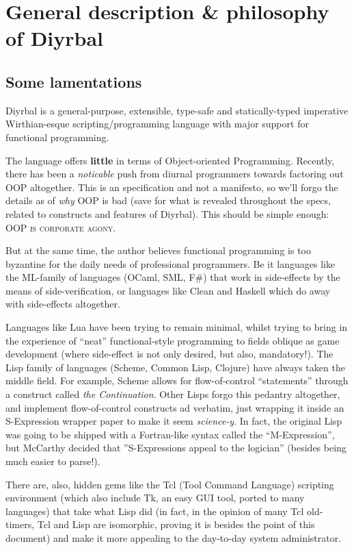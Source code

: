 \documentclass[a4paper,12pt]{article}
\newcommand{\nm}{Diyrbal\xspace}
\begin{document}
\section{General description \& philosophy of \nm}

\subsection{Some lamentations}

\nm is a general-purpose, extensible, type-safe and statically-typed imperative Wirthian-esque scripting/programming language with major support for functional programming. 

The language offers \textbf{little} in terms of Object-oriented Programming. Recently, there has been a \textit{noticable} push from diurnal programmers towards factoring out OOP altogether. This is an specification and not a manifesto, so we'll forgo the details as of \textit{why} OOP is bad (save for what is revealed throughout the specs, related to constructs and features of \nm). This should be simple enough: \textsc{OOP is corporate agony}.

But at the same time, the author believes functional programming is too byzantine for the daily needs of professional programmers. Be it languages like the ML-family of languages (OCaml, SML, F#) that work in side-effects by the means of side-verification, or languages like Clean and Haskell which do away with side-effects altogether.

Languages like Lua have been trying to remain minimal, whilst trying to bring in the experience of ``neat'' functional-style programming to fields oblique as game development (where side-effect is not only desired, but also, mandatory!). The Lisp family of languages (Scheme, Common Lisp, Clojure) have always taken the middle field. For example, Scheme allows for flow-of-control ``statements'' through a construct called \textit{the Continuation}. Other Lisps forgo this pedantry altogether, and implement flow-of-control constructs ad verbatim, just wrapping it inside an S-Expression wrapper paper to make it seem \textit{science-y}. In fact, the original Lisp was going to be shipped with a Fortran-like syntax called the ``M-Expression'', but McCarthy decided that ''S-Expressions appeal to the logician'' (besides being much easier to parse!).

There are, also, hidden gems like the Tcl (Tool Command Language) scripting environment (which also include Tk, an easy GUI tool, ported to many languages) that take what Lisp did (in fact, in the opinion of many Tcl old-timers, Tcl and Lisp are isomorphic, proving it is besides the point of this document) and make it more appealing to the day-to-day system administrator.
\end{document}
